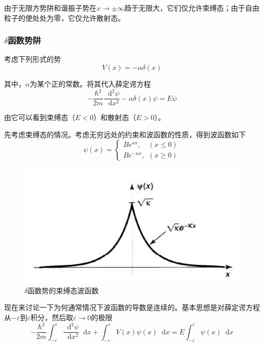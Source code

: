 \documentclass[UTF8]{ctexart}
\newcommand*{\dif}{\mathop{}\!\mathrm{d}}
\begin{document}
    由于无限方势阱和谐振子势在$x \to \pm \infty$趋于无限大，它们仅允许束缚态；由于自由粒子的使处处为零，它仅允许散射态。

    \subsubsection{\texorpdfstring{$\delta$}{Lg}函数势阱}
    考虑下列形式的势
    \begin{equation}
        V(x) = - \alpha \delta(x)
    \end{equation}

\noindent 其中，$\alpha$为某个正的常数。将其代入薛定谔方程
\begin{equation}
    - \frac{\hbar^2}{2m} \frac{\mathop{}\!\mathrm{d}^2 \psi}{\mathop{}\!\mathrm{d} x^2} - \alpha \delta(x) \psi = E \psi 
\end{equation}

\noindent 由它可以看到束缚态（$E<0$）和散射态（$E>0$）。

    先考虑束缚态的情况。考虑无穷远处的约束和波函数的性质，得到波函数如下
    \begin{equation}
        \psi(x) = \left\{\begin{array}{l}
            {Be^{\kappa x}, \quad (x \le 0)}\\
            {Be^{-\kappa x},\ \  (x \ge 0)}
        \end{array}\right.
    \end{equation}

    \begin{figure}[htb]
        \centering
        \includegraphics[width=12cm]{figure2-1.jpg}
        \caption{$\delta$函数势的束缚态波函数}
        \label{figure2.1}
    \end{figure}

    现在来讨论一下为何通常情况下波函数的导数是连续的。基本思想是对薛定谔方程从$-\varepsilon$到$\varepsilon$积分，然后取$\varepsilon \to 0$的极限
    \begin{equation}
        -\frac{\hbar^{2}}{2 m} \int_{-\varepsilon}^{\varepsilon} \frac{\dif^{2} \psi}{\dif x^{2}} \dif x+\int_{-\varepsilon}^{\varepsilon} V(x) \psi(x) \dif x=E \int_{-\varepsilon}^{\varepsilon} \psi(x) \dif x
    \end{equation}
\end{document}
